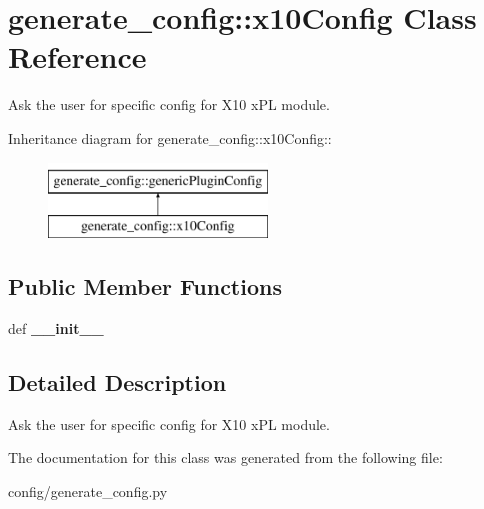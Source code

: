 \hypertarget{classgenerate__config_1_1x10Config}{
\section{generate\_\-config::x10Config Class Reference}
\label{classgenerate__config_1_1x10Config}
}
Ask the user for specific config for X10 xPL module.  


Inheritance diagram for generate\_\-config::x10Config::\begin{figure}[H]
\begin{center}
\leavevmode
\includegraphics[height=2cm]{classgenerate__config_1_1x10Config}
\end{center}
\end{figure}
\subsection*{Public Member Functions}
\begin{CompactItemize}
\item 
\hypertarget{classgenerate__config_1_1x10Config_ebb61db62b6f7df09e9061255514bb70}{
def \textbf{\_\-\_\-init\_\-\_\-}}
\label{classgenerate__config_1_1x10Config_ebb61db62b6f7df09e9061255514bb70}

\end{CompactItemize}


\subsection{Detailed Description}
Ask the user for specific config for X10 xPL module. 

The documentation for this class was generated from the following file:\begin{CompactItemize}
\item 
config/generate\_\-config.py\end{CompactItemize}

